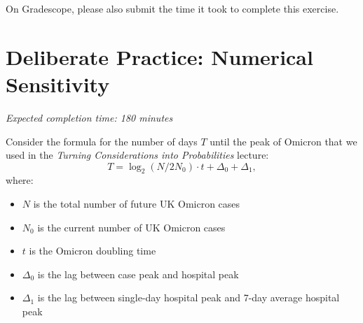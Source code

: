 \documentclass[11pt]{article}
\begin{document}
\begin{enumerate}





\end{enumerate}

On Gradescope, please also submit the time it took to complete this exercise.

\newpage

\section*{Deliberate Practice: Numerical Sensitivity}

\emph{Expected completion time: 180 minutes}

Consider the formula for the number of days $T$ until the peak of Omicron that we used in the \emph{Turning Considerations into Probabilities} lecture:
$$T = \log_2(N / 2 N_0) \cdot t + \Delta_0 + \Delta_1,$$
where:
\begin{itemize}
	\item $N$ is the total number of future UK Omicron cases
	\item $N_0$ is the current number of UK Omicron cases
	\item $t$ is the Omicron doubling time
	\item $\Delta_0$ is the lag between case peak and hospital peak
	\item $\Delta_1$ is the lag between single-day hospital peak and 7-day average hospital peak
\end{itemize}
\end{document}

